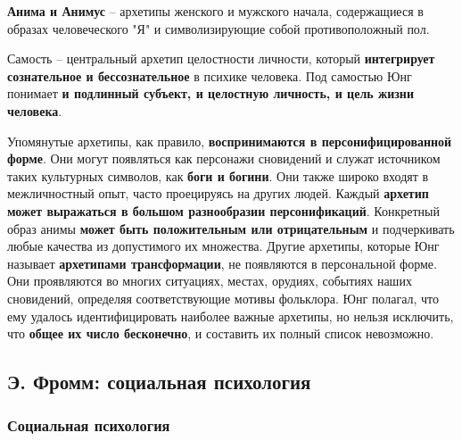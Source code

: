 \documentclass{article}
\begin{document}
\begin{flushleft}
\textbf{Анима и Анимус} – архетипы женского и мужского начала, содержащиеся в образах человеческого "Я" и символизирующие собой противоположный пол.

Самость – центральный архетип целостности личности, который \textbf{интегрирует сознательное и бессознательное} в психике человека. Под самостью Юнг понимает \textbf{и подлинный субъект, и целостную личность, и цель жизни человека}.

\hfill

Упомянутые архетипы, как правило, \textbf{воспринимаются в персонифицированной форме}. Они могут появляться как персонажи сновидений и служат источником таких культурных символов, как \textbf{боги и богини}. Они также широко входят в межличностный опыт, часто проецируясь на других людей. Каждый \textbf{архетип может выражаться в большом разнообразии персонификаций}. Конкретный образ анимы \textbf{может быть положительным или отрицательным} и подчеркивать любые качества из допустимого их множества. Другие архетипы, которые Юнг называет \textbf{архетипами трансформации}, не появляются в персональной форме. Они проявляются во многих ситуациях, местах, орудиях, событиях наших сновидений, определяя соответствующие мотивы фольклора. Юнг полагал, что ему удалось идентифицировать наиболее важные архетипы, но нельзя исключить, что \textbf{общее их число бесконечно}, и составить их полный список невозможно.
    
\end{flushleft}

\pagebreak
\subsection{Э. Фромм: социальная психология}

\subsubsection{Социальная психология}
\end{document}

